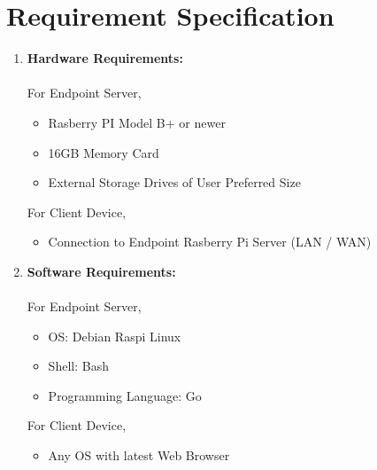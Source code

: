 \documentclass[12pt]{article}
\begin{document}
\section{Requirement Specification}
\vspace{2cm}
\begin{enumerate}
	\item \textbf{Hardware Requirements:} \\ \\
		For Endpoint Server,
		\begin{itemize}
			\item Rasberry PI Model B+ or newer
			\item 16GB Memory Card
			\item External Storage Drives of User Preferred Size
		\end{itemize}
		For Client Device,
		\begin{itemize}
			\item Connection to Endpoint Rasberry Pi Server (LAN / WAN)
		\end{itemize}

	\vspace{1cm}
	\item \textbf{Software Requirements:} \\ \\
		For Endpoint Server,
		\begin{itemize}
				\item OS: Debian Raspi Linux
				\item Shell: Bash
				\item Programming Language: Go
		\end{itemize}
		For Client Device,
		\begin{itemize}
			\item Any OS with latest Web Browser
		\end{itemize}
\end{enumerate}

\fi  %


\iftrue  %
\fontsize{12pt}{16pt}\selectfont
\end{document}
